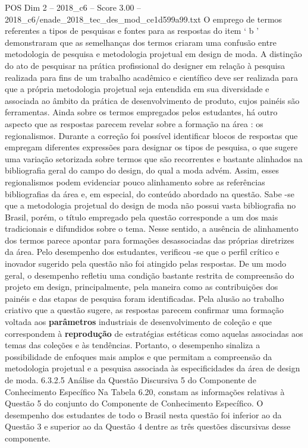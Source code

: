 \begin{textsample}{POS Dim 2 – 2018\_c6 – Score 3.00 – 2018\_c6/enade\_2018\_tec\_des\_mod\_ce1d599a99.txt}
O emprego de termos referentes a tipos de pesquisas e fontes para as respostas do item ‘ b ’ demonstraram que as semelhanças dos termos criaram uma confusão entre metodologia de pesquisa e metodologia projetual em design de moda.
A distinção do ato de pesquisar na prática profissional do designer em relação à pesquisa realizada para fins de um trabalho acadêmico e científico deve ser realizada para que a própria metodologia projetual seja entendida em sua diversidade e associada ao âmbito da prática de desenvolvimento de produto, cujos painéis são ferramentas.
Ainda sobre os termos empregados pelos estudantes, há outro aspecto que as respostas parecem revelar sobre a formação na área : os regionalismos.
Durante a correção foi possível identificar blocos de respostas que empregam diferentes expressões para designar os tipos de pesquisa, o que sugere uma variação setorizada sobre termos que são recorrentes e bastante alinhados na bibliografia geral do campo do design, do qual a moda advém.
Assim, esses regionalismos podem evidenciar pouco alinhamento sobre as referências bibliografias da área e, em especial, do conteúdo abordado na questão.
Sabe -se que a metodologia projetual do design de moda não possui vasta bibliografia no Brasil, porém, o título empregado pela questão corresponde a um dos mais tradicionais e difundidos sobre o tema.
Nesse sentido, a ausência de alinhamento dos termos parece apontar para formações desassociadas das próprias diretrizes da área.
Pelo desempenho dos estudantes, verificou -se que o perfil crítico e inovador sugerido pela questão não foi atingido pelas respostas.
De um modo geral, o desempenho refletiu uma condição bastante restrita de compreensão do projeto em design, principalmente, pela maneira como as contribuições dos painéis e das etapas de pesquisa foram identificadas.
Pela alusão ao trabalho criativo que a questão sugere, as respostas parecem confirmar uma formação voltada aos \textbf{parâmetros} industriais de desenvolvimento de coleção e que correspondem à \textbf{reprodução} de estratégias estéticas como aquelas associadas aos temas das coleções e às tendências.
Portanto, o desempenho sinaliza a possibilidade de enfoques mais amplos e que permitam a compreensão da metodologia projetual e a pesquisa associada às especificidades da área de design de moda. 6.3.2.5 Análise da Questão Discursiva 5 do Componente de Conhecimento Específico Na Tabela 6.20, constam as informações relativas à Questão 5 do conjunto do Componente de Conhecimento Específico.
O desempenho dos estudantes de todo o Brasil nesta questão foi inferior ao da Questão 3 e superior ao da Questão 4 dentre as três questões discursivas desse componente.

\end{textsample}

